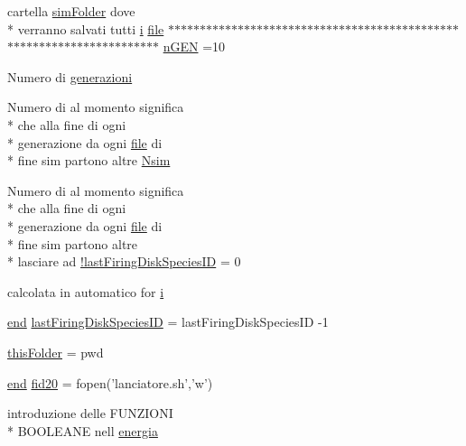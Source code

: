 \begin{DoxyCompactItemize}
cartella \hyperlink{a00032_aa671e3345005bd599e662bcaa115b18a}{sim\-Folder} dove \\*
verranno salvati tutti \hyperlink{a00071_ad3efca1ea6e3333daf30719ee0501862}{i} \hyperlink{a00068_a4e8353d6c62cf54bf4a1a8f63e56b8c3}{file} $\ast$$\ast$$\ast$$\ast$$\ast$$\ast$$\ast$$\ast$$\ast$$\ast$$\ast$$\ast$$\ast$$\ast$$\ast$$\ast$$\ast$$\ast$$\ast$$\ast$$\ast$$\ast$$\ast$$\ast$$\ast$$\ast$$\ast$$\ast$$\ast$$\ast$$\ast$$\ast$$\ast$$\ast$$\ast$$\ast$$\ast$$\ast$$\ast$$\ast$$\ast$$\ast$$\ast$$\ast$$\ast$$\ast$$\ast$$\ast$$\ast$$\ast$$\ast$$\ast$$\ast$$\ast$$\ast$$\ast$$\ast$$\ast$$\ast$$\ast$$\ast$$\ast$$\ast$$\ast$$\ast$$\ast$$\ast$$\ast$$\ast$$\ast$ \hyperlink{a00071_a4c8fe523edbe179c5d215da13f469f72}{n\-G\-E\-N} =10
\item 
Numero di \hyperlink{a00071_a5951b3462407a0e7e2e60534f76f5fec}{generazioni}
\item 
Numero di al momento significa \\*
che alla fine di ogni \\*
generazione da ogni \hyperlink{a00068_a4e8353d6c62cf54bf4a1a8f63e56b8c3}{file} di \\*
fine sim partono altre \hyperlink{a00071_af882a6050e97fe1c6cc2bb391ea57479}{Nsim}
\item 
Numero di al momento significa \\*
che alla fine di ogni \\*
generazione da ogni \hyperlink{a00068_a4e8353d6c62cf54bf4a1a8f63e56b8c3}{file} di \\*
fine sim partono altre \\*
lasciare ad \hyperlink{a00071_aafb51343927e7262fbd66ce291fdbb87}{!last\-Firing\-Disk\-Species\-I\-D} = 0
\item 
calcolata in automatico for \hyperlink{a00071_ad3efca1ea6e3333daf30719ee0501862}{i}
\item 
\hyperlink{a00025_afb358f48b1646c750fb9da6c6585be2b}{end} \hyperlink{a00071_ac9358e0c7555a21532187de31cdbd469}{last\-Firing\-Disk\-Species\-I\-D} = last\-Firing\-Disk\-Species\-I\-D -\/1
\item 
\hyperlink{a00071_a2d4125646b62462ce279d82913125ccf}{this\-Folder} = pwd
\item 
\hyperlink{a00025_afb358f48b1646c750fb9da6c6585be2b}{end} \hyperlink{a00071_aaad88534fbf3d065202db78a891374ca}{fid20} = fopen('lanciatore.\-sh','w')
\item 
introduzione delle F\-U\-N\-Z\-I\-O\-N\-I \\*
B\-O\-O\-L\-E\-A\-N\-E nell \hyperlink{a00071_a15a0e3f3007df072a07460518322b944}{energia}
$$
\end{DoxyCompactItemize}

